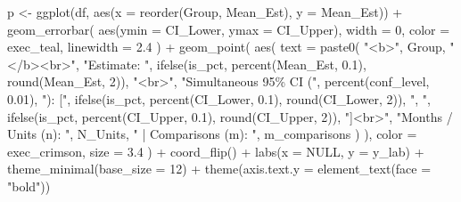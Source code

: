 \documentclass[
  letterpaper,
  DIV=11,
  numbers=noendperiod]{scrartcl}
\newenvironment{Shaded}{\begin{snugshade}}{\end{snugshade}}
\newcommand{\AttributeTok}[1]{\textcolor[rgb]{0.40,0.45,0.13}{#1}}
\newcommand{\ConstantTok}[1]{\textcolor[rgb]{0.56,0.35,0.01}{#1}}
\newcommand{\DecValTok}[1]{\textcolor[rgb]{0.68,0.00,0.00}{#1}}
\newcommand{\FloatTok}[1]{\textcolor[rgb]{0.68,0.00,0.00}{#1}}
\newcommand{\FunctionTok}[1]{\textcolor[rgb]{0.28,0.35,0.67}{#1}}
\newcommand{\NormalTok}[1]{\textcolor[rgb]{0.00,0.23,0.31}{#1}}
\newcommand{\OtherTok}[1]{\textcolor[rgb]{0.00,0.23,0.31}{#1}}
\newcommand{\SpecialCharTok}[1]{\textcolor[rgb]{0.37,0.37,0.37}{#1}}
\newcommand{\StringTok}[1]{\textcolor[rgb]{0.13,0.47,0.30}{#1}}
\begin{document}
\begin{Shaded}
\begin{Highlighting}[]
\NormalTok{    p }\OtherTok{\textless{}{-}} \FunctionTok{ggplot}\NormalTok{(df, }\FunctionTok{aes}\NormalTok{(}\AttributeTok{x =} \FunctionTok{reorder}\NormalTok{(Group, Mean\_Est), }\AttributeTok{y =}\NormalTok{ Mean\_Est)) }\SpecialCharTok{+}
      \FunctionTok{geom\_errorbar}\NormalTok{(}
        \FunctionTok{aes}\NormalTok{(}\AttributeTok{ymin =}\NormalTok{ CI\_Lower, }\AttributeTok{ymax =}\NormalTok{ CI\_Upper),}
        \AttributeTok{width =} \DecValTok{0}\NormalTok{, }\AttributeTok{color =}\NormalTok{ exec\_teal, }\AttributeTok{linewidth =} \FloatTok{2.4}
\NormalTok{      ) }\SpecialCharTok{+}
      \FunctionTok{geom\_point}\NormalTok{(}
        \FunctionTok{aes}\NormalTok{(}
          \AttributeTok{text =} \FunctionTok{paste0}\NormalTok{(}
            \StringTok{"\textless{}b\textgreater{}"}\NormalTok{, Group, }\StringTok{"\textless{}/b\textgreater{}\textless{}br\textgreater{}"}\NormalTok{,}
            \StringTok{"Estimate: "}\NormalTok{, }\FunctionTok{ifelse}\NormalTok{(is\_pct, }\FunctionTok{percent}\NormalTok{(Mean\_Est, }\FloatTok{0.1}\NormalTok{), }\FunctionTok{round}\NormalTok{(Mean\_Est, }\DecValTok{2}\NormalTok{)), }\StringTok{"\textless{}br\textgreater{}"}\NormalTok{,}
            \StringTok{"Simultaneous 95\% CI ("}\NormalTok{, }\FunctionTok{percent}\NormalTok{(conf\_level, }\FloatTok{0.01}\NormalTok{), }\StringTok{"): ["}\NormalTok{,}
            \FunctionTok{ifelse}\NormalTok{(is\_pct, }\FunctionTok{percent}\NormalTok{(CI\_Lower, }\FloatTok{0.1}\NormalTok{), }\FunctionTok{round}\NormalTok{(CI\_Lower, }\DecValTok{2}\NormalTok{)), }\StringTok{", "}\NormalTok{,}
            \FunctionTok{ifelse}\NormalTok{(is\_pct, }\FunctionTok{percent}\NormalTok{(CI\_Upper, }\FloatTok{0.1}\NormalTok{), }\FunctionTok{round}\NormalTok{(CI\_Upper, }\DecValTok{2}\NormalTok{)), }\StringTok{"]\textless{}br\textgreater{}"}\NormalTok{,}
            \StringTok{"Months / Units (n): "}\NormalTok{, N\_Units, }\StringTok{" | Comparisons (m): "}\NormalTok{, m\_comparisons}
\NormalTok{          )}
\NormalTok{        ),}
        \AttributeTok{color =}\NormalTok{ exec\_crimson, }\AttributeTok{size =} \FloatTok{3.4}
\NormalTok{      ) }\SpecialCharTok{+}
      \FunctionTok{coord\_flip}\NormalTok{() }\SpecialCharTok{+}
      \FunctionTok{labs}\NormalTok{(}\AttributeTok{x =} \ConstantTok{NULL}\NormalTok{, }\AttributeTok{y =}\NormalTok{ y\_lab) }\SpecialCharTok{+}
      \FunctionTok{theme\_minimal}\NormalTok{(}\AttributeTok{base\_size =} \DecValTok{12}\NormalTok{) }\SpecialCharTok{+}
      \FunctionTok{theme}\NormalTok{(}\AttributeTok{axis.text.y =} \FunctionTok{element\_text}\NormalTok{(}\AttributeTok{face =} \StringTok{"bold"}\NormalTok{))}


\end{Highlighting}
\end{Shaded}
\end{document}
